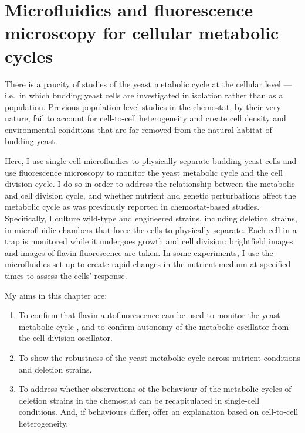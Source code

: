 
\chapter{Microfluidics and fluorescence microscopy for cellular metabolic cycles}
\label{ch:biology}

There is a paucity of studies of the yeast metabolic cycle at the cellular level --- i.e.\ in which budding yeast cells are investigated in isolation rather than as a population.
Previous population-level studies in the chemostat, by their very nature, fail to account for cell-to-cell heterogeneity and create cell density and environmental conditions that are far removed from the natural habitat of budding yeast.

Here, I use single-cell microfluidics to physically separate budding yeast cells and use fluorescence microscopy to monitor the yeast metabolic cycle and the cell division cycle.
I do so in order to address the relationship between the metabolic and cell division cycle, and whether nutrient and genetic perturbations affect the metabolic cycle as was previously reported in chemostat-based studies.
Specifically, I culture wild-type and engineered strains, including deletion strains, in microfluidic chambers that force the cells to physically separate.
Each cell in a trap is monitored while it undergoes growth and cell division: brightfield images and images of flavin fluorescence are taken.
In some experiments, I use the microfluidics set-up to create rapid changes in the nutrient medium at specified times to assess the cells' response.

My aims in this chapter are:
\begin{enumerate}
  \item To confirm that flavin autofluorescence can be used to monitor the yeast metabolic cycle \parencite{baumgartnerFlavinbasedMetabolicCycles2018}, and to confirm autonomy of the metabolic oscillator from the cell division oscillator.
  \item To show the robustness of the yeast metabolic cycle across nutrient conditions and deletion strains.
  \item To address whether observations of the behaviour of the metabolic cycles of deletion strains in the chemostat can be recapitulated in single-cell conditions.
        And, if behaviours differ, offer an explanation based on cell-to-cell heterogeneity.
\end{enumerate}

